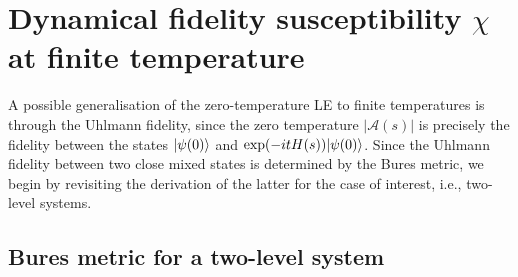 \section*{Dynamical fidelity susceptibility $\chi$ at finite temperature}

A possible generalisation of the zero-temperature LE to finite temperatures is through  the Uhlmann fidelity, since the zero temperature $|\mathcal{A}(s)|$ is precisely the fidelity between the states $| \psi(0) \rangle$ and $\exp(-itH(s))| \psi(0) \rangle$. Since the Uhlmann fidelity between two close mixed states is determined by the Bures metric, we begin by revisiting the derivation of the latter for the case of interest, i.e., two-level systems.


\subsection*{Bures metric for a two-level system}

